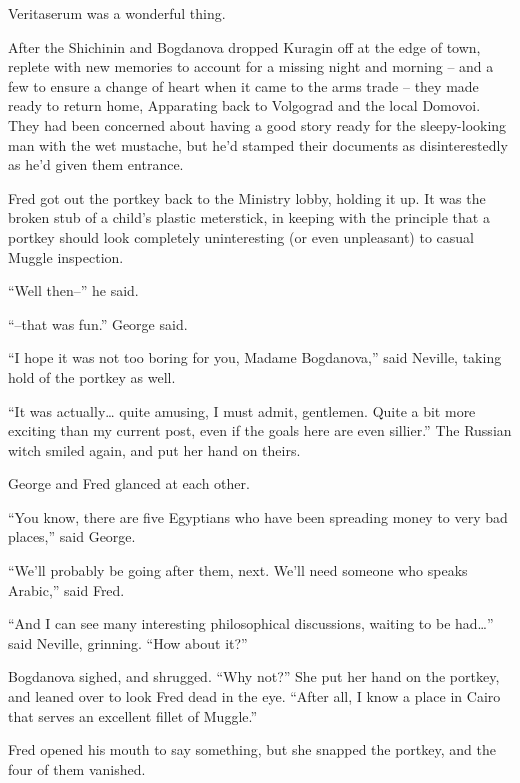 Veritaserum was a wonderful thing.

After the Shichinin and Bogdanova dropped Kuragin off at the edge of
town, replete with new memories to account for a missing night and
morning -- and a few to ensure a change of heart when it came to the
arms trade -- they made ready to return home, Apparating back to
Volgograd and the local Domovoi. They had been concerned about having a
good story ready for the sleepy-looking man with the wet mustache, but
he'd stamped their documents as disinterestedly as he'd given them
entrance.

Fred got out the portkey back to the Ministry lobby, holding it up. It
was the broken stub of a child's plastic meterstick, in keeping with the
principle that a portkey should look completely uninteresting (or even
unpleasant) to casual Muggle inspection.

``Well then--'' he said.

``--that was fun.'' George said.

``I hope it was not too boring for you, Madame Bogdanova,'' said
Neville, taking hold of the portkey as well.

``It was actually\ldots{} quite amusing, I must admit, gentlemen. Quite
a bit more exciting than my current post, even if the goals here are
even sillier.'' The Russian witch smiled again, and put her hand on
theirs.

George and Fred glanced at each other.

``You know, there are five Egyptians who have been spreading money to
very bad places,'' said George.

``We'll probably be going after them, next. We'll need someone who
speaks Arabic,'' said Fred.

``And I can see many interesting philosophical discussions, waiting to
be had\ldots{}'' said Neville, grinning. ``How about it?''

Bogdanova sighed, and shrugged. ``Why not?'' She put her hand on the
portkey, and leaned over to look Fred dead in the eye. ``After all, I
know a place in Cairo that serves an excellent fillet of Muggle.''

Fred opened his mouth to say something, but she snapped the portkey, and
the four of them vanished. \Stopbonus
